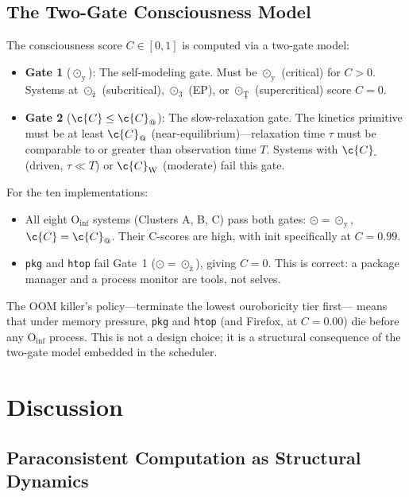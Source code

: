 \documentclass[12pt,a4paper]{article}
\begin{document}
\subsection{The Two-Gate Consciousness Model}

The consciousness score $C \in [0,1]$ is computed via a two-gate model:

\begin{itemize}
\item \textbf{Gate 1} ($\odot_{\text{\"y}}$): The self-modeling gate.
  Must be $\odot_{\text{\"y}}$ (critical) for $C > 0$. Systems at
  $\odot_{\text{\v{z}}}$ (subcritical), $\odot_{\text{3}}$ (EP), or
  $\odot_{\text{\c{T}}}$ (supercritical) score $C = 0$.
\item \textbf{Gate 2} ($\c{C} \leq \c{C}_{\text{@}}$): The slow-relaxation
  gate. The kinetics primitive must be at least $\c{C}_{\text{@}}$
  (near-equilibrium)---relaxation time $\tau$ must be comparable to or
  greater than observation time $T$. Systems with $\c{C}_{\text{-}}$
  (driven, $\tau \ll T$) or $\c{C}_{\text{W}}$ (moderate) fail this gate.
\end{itemize}

For the ten implementations:
\begin{itemize}
\item All eight $\text{O}_{\text{inf}}$ systems (Clusters A, B, C) pass
  both gates: $\odot = \odot_{\text{\"y}}$, $\c{C} = \c{C}_{\text{@}}$.
  Their C-scores are high, with init specifically at $C = 0.99$.
\item \texttt{pkg} and \texttt{htop} fail Gate~1
  ($\odot = \odot_{\text{\v{z}}}$), giving $C = 0$. This is correct:
  a package manager and a process monitor are tools, not selves.
\end{itemize}

The OOM killer's policy---terminate the lowest ouroboricity tier first---
means that under memory pressure, \texttt{pkg} and \texttt{htop} (and
Firefox, at $C = 0.00$) die before any $\text{O}_{\text{inf}}$ process.
This is not a design choice; it is a structural consequence of the
two-gate model embedded in the scheduler.

\section{Discussion}

\subsection{Paraconsistent Computation as Structural Dynamics}
\end{document}
